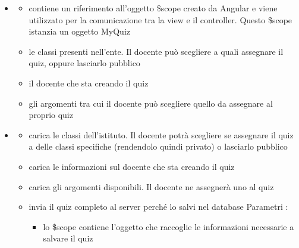 \begin{itemize}
\item {}
\begin{itemize}
\item {}
\newline
contiene un riferimento all'oggetto \$scope creato da Angular e viene utilizzato per la comunicazione tra la view e il controller. Questo \$scope istanzia un oggetto MyQuiz
\item {}
\newline
le classi presenti nell'ente. Il docente può scegliere a quali assegnare il quiz, oppure lasciarlo pubblico
\item {}
\newline
il docente che sta creando il quiz
\item {}
\newline
gli argomenti tra cui il docente può scegliere quello da assegnare al proprio quiz
\end{itemize}
\item {}
\begin{itemize}
\item {}
\newline
carica le classi dell'istituto. Il docente potrà scegliere se assegnare il quiz a delle classi specifiche (rendendolo quindi privato) o lasciarlo pubblico
\newline
\item {}
\newline
carica le informazioni sul docente che sta creando il quiz
\newline
\item {}
\newline
carica gli argomenti disponibili. Il docente ne assegnerà uno al quiz
\newline
\item {}
\newline
invia il quiz completo al server perché lo salvi nel database
\newline
Parametri :
\begin{itemize}
\item {}
\newline
lo \$scope contiene l'oggetto che raccoglie le informazioni necessarie a salvare il quiz
\end{itemize}
\end{itemize}
\end{itemize}
